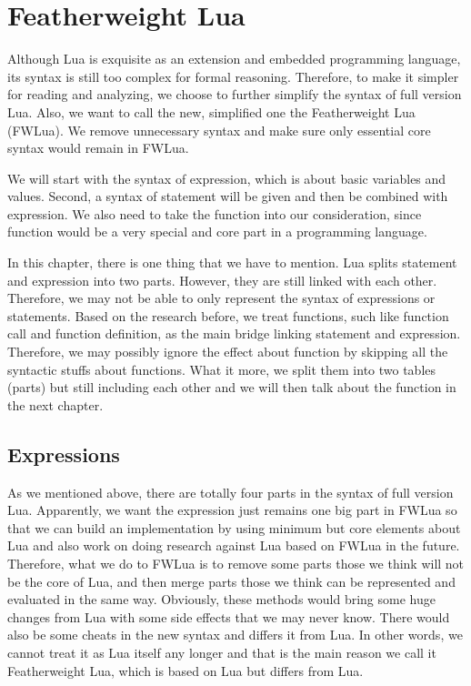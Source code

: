 \documentclass{article}
\begin{document}
\section{Featherweight Lua}
Although Lua is exquisite as an extension and embedded programming language, its syntax is still too complex for formal reasoning. Therefore, to make it simpler for reading and analyzing, we choose to further simplify the syntax of full version Lua. Also, we want to call the new, simplified one the Featherweight Lua (FWLua). We remove unnecessary syntax and make sure only essential core syntax would remain in FWLua.

We will start with the syntax of expression, which is about basic variables and values. Second, a syntax of statement will be given and then be combined with expression. We also need to take the function into our consideration, since function would be a very special and core part in a programming language.

In this chapter, there is one thing that we have to mention. Lua splits statement and expression into two parts. However, they are still linked with each other. Therefore, we may not be able to only represent the syntax of expressions or statements. Based on the research before, we treat functions, such like function call and function definition, as the main bridge linking statement and expression. Therefore, we may possibly ignore the effect about function by skipping all the syntactic stuffs about functions. What it more, we split them into two tables (parts) but still including each other and we will then talk about the function in the next chapter.

\subsection{Expressions}
As we mentioned above, there are totally four parts in the syntax of full version Lua. Apparently, we want the expression just remains one big part in FWLua so that we can build an implementation by using minimum but core elements about Lua and also work on doing research against Lua based on FWLua in the future. Therefore, what we do to FWLua is to remove some parts those we think will not be the core of Lua, and then merge parts those we think can be represented and evaluated in the same way. Obviously, these methods would bring some huge changes from Lua with some side effects that we may never know. There would also be some cheats in the new syntax and differs it from Lua. In other words, we cannot treat it as Lua itself any longer and that is the main reason we call it Featherweight Lua, which is based on Lua but differs from Lua.
\end{document}

